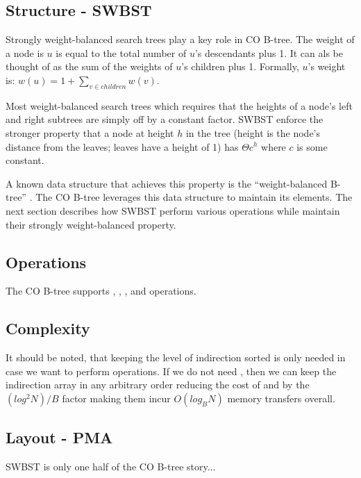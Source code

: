\documentclass{style}
\begin{document}
\subsection{Structure - SWBST}
\label{sec:structure}

Strongly weight-balanced search trees play a key role in CO B-tree. The weight
of a node is $u$ is equal to the total number of $u$'s descendants plus 1. It
can als be thought of as the sum of the weights of $u$'s children plus 1.
Formally, $u$'s weight is: $w(u) = 1 + \sum_{v \in children} w(v)$.

Most weight-balanced search trees which requires that the heights of a node's
left and right subtrees are simply off by a constant factor. SWBST enforce the
stronger property that a node at height $h$ in the tree (height is the node's
distance from the leaves; leaves have a height of 1) has $\Theta c^h$ where
$c$ is some constant.

A known data structure that achieves this property is the ``weight-balanced
B-tree'' \cite{paper}. The CO B-tree leverages this data structure to maintain
its elements. The next section describes how SWBST perform various operations
while maintain their strongly weight-balanced property.

\subsection{Operations}

The CO B-tree supports \Search, \Insert, \Delete, and \Scan operations. 

\subsection{Complexity}



It should be noted, that keeping the level of indirection sorted is only
needed in case we want to perform \Scan operations. If we do not need \Scan,
then we can keep the indirection array in any arbitrary order reducing the
cost of \Insert and \Delete by the $(log^2 N) /B$ factor making them incur
$O(log_{B} N)$ memory transfers overall.

\subsection{Layout - PMA}
\label{sec:layout}

SWBST is only one half of the CO B-tree story...
\end{document}

